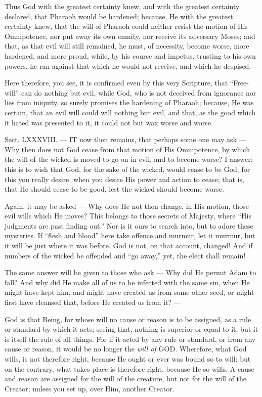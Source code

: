 Thus God with the greatest certainty knew, and with the greatest certainty declared, that Pharaoh would be hardened; because, He with the greatest certainty knew, that the will of Pharaoh could neither resist the motion of His Omnipotence, nor put away its own enmity, nor receive its adversary Moses; and that, as that evil will still remained, he must, of necessity, become worse, more hardened, and more proud, while, by his course and impetus, trusting to his own powers, he ran against that which he would not receive, and which he despised.

Here therefore, you see, it is confirmed even by this very Scripture, that “Free-will” can do nothing but evil, while God, who is not deceived from ignorance nor lies from iniquity, so surely promises the hardening of Pharaoh; because, He was certain, that an evil will could will nothing but evil, and that, as the good which it hated was presented to it, it could not but wax worse and worse.


Sect. LXXXVIII. — IT now then remains, that perhaps some one may ask — Why then does not God cease from that motion of His Omnipotence, by which the will of the wicked is moved to go on in evil, and to become worse? I answer: this is to wish that God, for the sake of the wicked, would cease to be God; for this you really desire, when you desire His power and action to cease; that is, that He should cease to be good, lest the wicked should become worse.

Again, it may be asked — Why does He not then change, in His motion, those evil wills which He moves? This belongs to those secrets of Majesty, where “His judgments are past finding out.” Nor is it ours to search into, but to adore these mysteries. If “flesh and blood” here take offence and murmur, let it murmur, but it will be just where it was before. God is not, on that account, changed! And if numbers of the wicked be offended and “go away,” yet, the elect shall remain!

The same answer will be given to those who ask — Why did He permit Adam to fall? And why did He make all of us to be infected with the same sin, when He might have kept him, and might have created us from some other seed, or might first have cleansed that, before He created us from it? —

God is that Being, for whose will no cause or reason is to be assigned, as a rule or standard by which it acts; seeing that, nothing is superior or equal to it, but it is itself the rule of all things. For if it acted by any rule or standard, or from any cause or reason, it would be no longer the \emph{will of }GOD. Wherefore, what God wills, is not therefore right, because He ought or ever was bound so to will; but on the contrary, what takes place is therefore right, because He so wills. A cause and reason are assigned for the will of the creature, but not for the will of the Creator; unless you set up, over Him, another Creator.

